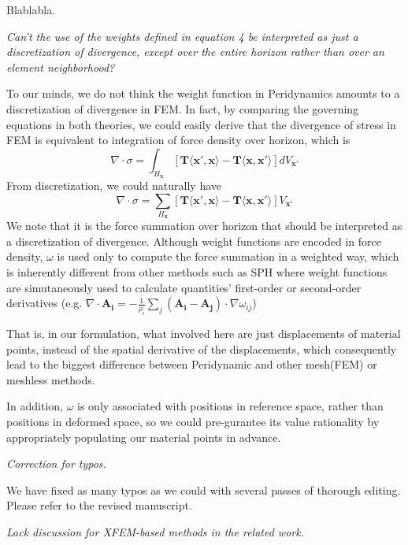 Blablabla.

\emph{Can't the use of the weights defined in equation 4 be interpreted as just a discretization of divergence, except over the entire horizon rather than over an element neighborhood?}

To our minds, we do not think the weight function in Peridynamics amounts to a discretization of divergence in FEM.
In fact, by comparing the governing equations in both theories, we could easily derive that
the divergence of stress in FEM is equivalent to integration of force density over horizon, which is
\begin{equation}
\nabla\cdot\sigma = \int_{H_\mathbf{x}}[\mathbf{T}\langle\mathbf{x}',\mathbf{x}\rangle - \mathbf{T}\langle\mathbf{x},\mathbf{x}'\rangle]dV_{\mathbf{x}'}
\end{equation}
From discretization, we could naturally have
\begin{equation}
\nabla\cdot\sigma = \sum_{H_\mathbf{x}}[\mathbf{T}\langle\mathbf{x}',\mathbf{x}\rangle - \mathbf{T}\langle\mathbf{x},\mathbf{x}'\rangle]V_{\mathbf{x}'}
\end{equation}
We note that it is the force summation over horizon that should be interpreted as a discretization of divergence.
Although weight functions are encoded in force density, $\omega$ is used only to compute the force summation in a weighted way, which is inherently different from other methods such as SPH where weight functions are simutaneously used to calculate quantities' first-order or second-order derivatives
(e.g. $\nabla\cdot\mathbf{A_i} = -\frac{1}{\rho_i}\sum_j(\mathbf{A_i - A_j})\cdot\nabla\omega_{ij}$)

That is, in our formulation, what involved here are just displacements of material points,
instead of the spatial derivative of the displacements, which consequently lead to the biggest difference between Peridynamic and other mesh(FEM) or meshless methods.

In addition, $\omega$ is only associated with positions in reference space, rather than positions in deformed space,
so we could pre-gurantee its value rationality by appropriately populating our material points in advance.

\emph{Correction for typos.}

We have fixed as many typos as we could with several passes of thorough editing. Please refer to the revised manuscript.

\emph{Lack discussion for XFEM-based methods in the related work.}


